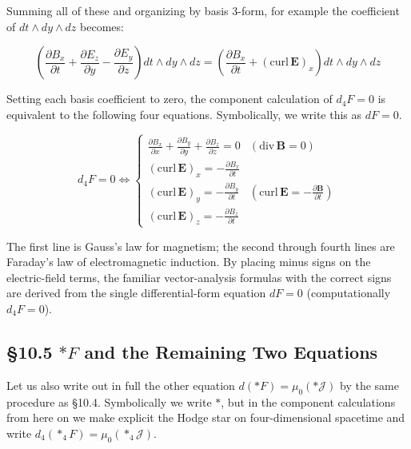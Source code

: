 \documentclass[a4paper,12pt,openany]{book}
\begin{document}
Summing all of these and organizing by basis \(3\)-form, for example the
coefficient of \(dt\wedge dy\wedge dz\) becomes:

\[
\left(\frac{\partial B_x}{\partial t} + \frac{\partial E_z}{\partial y} - \frac{\partial E_y}{\partial z}\right) dt\wedge dy\wedge dz = \left(\frac{\partial B_x}{\partial t} + (\mathrm{curl}\,\mathbf{E})_x\right) dt\wedge dy\wedge dz
\]

Setting each basis coefficient to zero, the component calculation of
\(d_4F=0\) is equivalent to the following four equations. Symbolically,
we write this as \(dF=0\).

\[d_4F = 0 \Longleftrightarrow \begin{cases}
\displaystyle \frac{\partial B_x}{\partial x} + \frac{\partial B_y}{\partial y} + \frac{\partial B_z}{\partial z} = 0 & (\mathrm{div}\,\mathbf{B} = 0) \\[1em]
\displaystyle (\mathrm{curl}\,\mathbf{E})_x = -\frac{\partial B_x}{\partial t} & \\[0.5em]
\displaystyle (\mathrm{curl}\,\mathbf{E})_y = -\frac{\partial B_y}{\partial t} & (\mathrm{curl}\,\mathbf{E} = -\frac{\partial\mathbf{B}}{\partial t}) \\[0.5em]
\displaystyle (\mathrm{curl}\,\mathbf{E})_z = -\frac{\partial B_z}{\partial t} &
\end{cases}\]

The first line is Gauss's law for magnetism; the second through fourth
lines are Faraday's law of electromagnetic induction. By placing minus
signs on the electric-field terms, the familiar vector-analysis formulas
with the correct signs are derived from the single differential-form
equation \(dF=0\) (computationally \(d_4F=0\)).

\par\vspace{0.35em}\par

\hypertarget{ast-f-and-the-remaining-two-equations}{%
\subsection{\texorpdfstring{§10.5 \(\ast F\) and the Remaining Two
Equations}{§10.5 \textbackslash ast F and the Remaining Two Equations}}\label{ast-f-and-the-remaining-two-equations}}

Let us also write out in full the other equation
\(d(\ast F) = \mu_0(\ast\mathcal{J})\) by the same procedure as §10.4.
Symbolically we write \(\ast\), but in the component calculations from
here on we make explicit the Hodge star on four-dimensional spacetime
and write \(d_4(\ast_4F)=\mu_0(\ast_4\mathcal{J})\).
\end{document}
